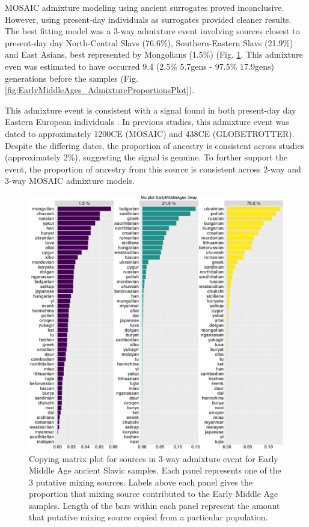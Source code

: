 MOSAIC admixture modeling using ancient surrogates proved inconclusive. However, using present-day individuals as surrogates provided cleaner results. The best fitting model was a 3-way admixture event involving sources closest to present-day day North-Central Slavs (76.6\%), Southern-Eastern Slavs (21.9\%) and East Asians, best represented by Mongolians (1.5\%) (Fig. \ref{fig:EarlyMiddleAges_MOSAIC_3way_moderns_Mu}. This admixture even was estimated to have occurred 9.4 (2.5\% 5.7gens - 97.5\% 17.9gens) generations before the samples (Fig. \ref{fig:EarlyMiddleAges_AdmixtureProportionsPlot}). 

This admixture event is consistent with a signal found in both present-day day Eastern European individuals \cite{MOSAIC_2019, Hellenthal2014}. In previous studies, this admixture event was dated to approximately 1200CE (MOSAIC) and 438CE (GLOBETROTTER). Despite the differing dates, the proportion of ancestry is consistent across studies (approximately 2\%), suggesting the signal is genuine. To further support the event, the proportion of ancestry from this source is consistent across 2-way and 3-way MOSAIC admixture models. 

\begin{figure}[htp]
    \centering
    \includegraphics[width=1.0\textwidth]{../images/chapter5/Mu_plot_EarlyMiddleAges_3way.pdf}
    \caption{Copying matrix plot for sources in 3-way admixture event for Early Middle Age ancient Slavic samples. Each panel represents one of the 3 putative mixing sources. Labels above each panel gives the proportion that mixing source contributed to the Early Middle Age samples. Length of the bars within each panel represent the amount that putative mixing source copied from a particular population.}
    \label{fig:EarlyMiddleAges_MOSAIC_3way_moderns_Mu}
\end{figure}

